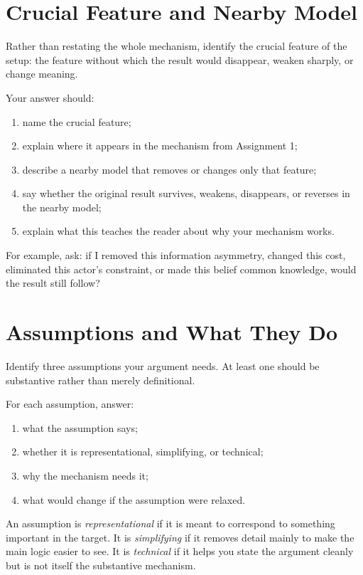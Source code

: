 \documentclass[12pt]{article}
\begin{document}
\section{Crucial Feature and Nearby Model}

Rather than restating the whole mechanism, identify the crucial feature of the setup: the feature without which the result would disappear, weaken sharply, or change meaning.

Your answer should:
\begin{enumerate}[label=(\alph*)]
\item name the crucial feature;
\item explain where it appears in the mechanism from Assignment 1;
\item describe a nearby model that removes or changes only that feature;
\item say whether the original result survives, weakens, disappears, or reverses in the nearby model;
\item explain what this teaches the reader about why your mechanism works.
\end{enumerate}

For example, ask: if I removed this information asymmetry, changed this cost, eliminated this actor's constraint, or made this belief common knowledge, would the result still follow?

\section{Assumptions and What They Do}

Identify three assumptions your argument needs. At least one should be substantive rather than merely definitional.

For each assumption, answer:
\begin{enumerate}[label=(\alph*)]
\item what the assumption says;
\item whether it is representational, simplifying, or technical;
\item why the mechanism needs it;
\item what would change if the assumption were relaxed.
\end{enumerate}

An assumption is \emph{representational} if it is meant to correspond to something important in the target. It is \emph{simplifying} if it removes detail mainly to make the main logic easier to see. It is \emph{technical} if it helps you state the argument cleanly but is not itself the substantive mechanism.
\end{document}
